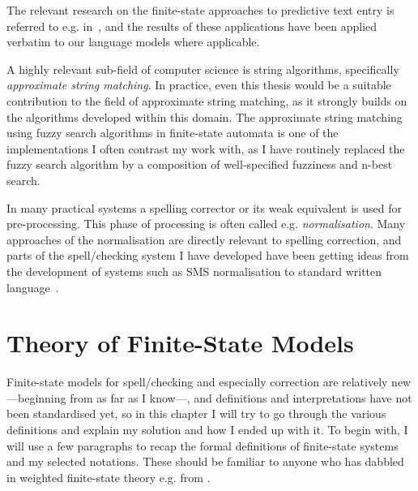 \documentclass[officiallayout]{unihelcompling}
\begin{document}
The relevant research on the finite-state approaches to predictive text entry
is referred to e.g. in~\citep{silfverberg2010partofspeech}, and the results of
these applications have been applied verbatim to our language models where
applicable.

A highly relevant sub-field of computer science is string algorithms,
specifically \emph{approximate string matching}. In practice, even this thesis
would be a suitable contribution to the field of approximate string matching,
as it strongly builds on the algorithms developed within this domain. The
approximate string matching using fuzzy search algorithms in finite-state
automata is one of the implementations I often contrast my work with, as I have
routinely replaced the fuzzy search algorithm by a composition of
well-specified fuzziness and n-best search.

In many practical systems a spelling corrector or its weak equivalent is used
for pre-processing. This phase of processing is often called e.g.
\emph{normalisation}. Many approaches of the normalisation are directly
relevant to spelling correction, and parts of the spell\-/checking system I
have developed have been getting ideas from the development of systems such as
SMS normalisation to standard written language~\citep{kobus2008normalizing}.

\section{Theory of Finite-State Models}
\label{sec:finite-state-theory}

Finite-state models for spell\-/checking and especially correction are relatively
new---beginning from \citep{oflazer1996errortolerant} as far as I know---, and
definitions and interpretations have not been standardised yet, so in this
chapter I will try to go through the various definitions and explain my
solution and how I ended up with it. To begin with, I will use a few paragraphs
to recap the formal definitions of finite-state systems and my selected
notations. These should be familiar to anyone who has dabbled in weighted
finite-state theory e.g. from \citet{aho2007compilers,mohri1997finitestate}.
\end{document}
